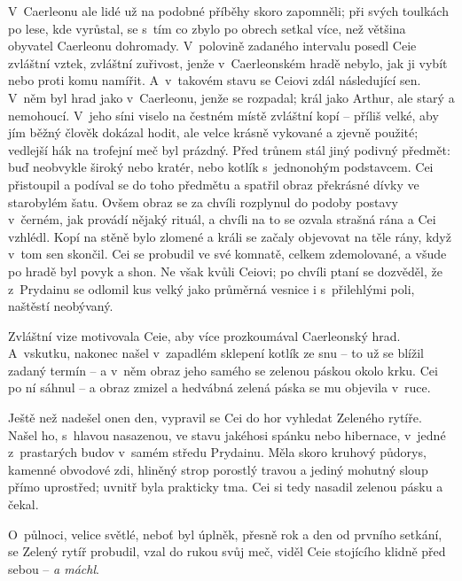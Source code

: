 \documentclass[a4paper,twocolumn,openany,nodeprecatedcode, justified]{dndbook}
\begin{document}
	V~Caerleonu ale lidé už na podobné příběhy skoro zapomněli; při svých toulkách po lese, kde vyrůstal, se s~tím co zbylo po obrech setkal více, než většina obyvatel Caerleonu dohromady. V~polovině zadaného intervalu posedl Ceie zvláštní vztek, zvláštní zuřivost, jenže v~Caerleonském hradě nebylo, jak ji vybít nebo proti komu namířit. A~v~takovém stavu se Ceiovi zdál následující sen. V~něm byl hrad jako v~Caerleonu, jenže se rozpadal; král jako Arthur, ale starý a nemohoucí. V~jeho síni viselo na čestném místě zvláštní kopí -- příliš velké, aby jím běžný člověk dokázal hodit, ale velce krásně vykované a zjevně použité; vedlejší hák na trofejní meč byl prázdný. Před trůnem stál jiný podivný předmět: buď neobvykle široký  nebo kratér, nebo kotlík s~jednonohým podstavcem. Cei přistoupil a podíval se do toho předmětu a spatřil obraz překrásné dívky ve starobylém šatu. Ovšem obraz se za chvíli rozplynul do podoby postavy v~černém, jak provádí nějaký rituál, a chvíli na to se ozvala strašná rána a Cei vzhlédl. Kopí na stěně bylo zlomené a králi se začaly objevovat na těle rány, když v~tom sen skončil. Cei se probudil ve své komnatě, celkem zdemolované, a všude po hradě byl povyk a shon. Ne však kvůli Ceiovi; po chvíli ptaní se dozvěděl, že z~Prydainu se odlomil kus velký jako průměrná vesnice i s~přilehlými poli, naštěstí neobývaný.
	
	Zvláštní vize motivovala Ceie, aby více prozkoumával Caerleonský hrad. A~vskutku, nakonec našel v~zapadlém sklepení kotlík ze snu -- to už se blížil zadaný termín -- a v~něm obraz jeho samého se zelenou páskou okolo krku. Cei po ní sáhnul -- a obraz zmizel a hedvábná zelená páska se mu objevila v~ruce.
	
	Ještě než nadešel onen den, vypravil se Cei do hor vyhledat Zeleného rytíře. Našel ho, s~hlavou nasazenou, ve stavu jakéhosi spánku nebo hibernace, v~jedné z~prastarých budov v~samém středu Prydainu. Měla skoro kruhový půdorys, kamenné obvodové zdi, hliněný strop porostlý travou a jediný mohutný sloup přímo uprostřed; uvnitř byla prakticky tma. Cei si tedy nasadil zelenou pásku a čekal.
	
	O~půlnoci, velice světlé, neboť byl úplněk, přesně rok a den od prvního setkání, se Zelený rytíř probudil, vzal do rukou svůj meč, viděl Ceie stojícího klidně před sebou -- \emph{a máchl}.
	
	\vspace{1\baselineskip}
	
\end{document}
